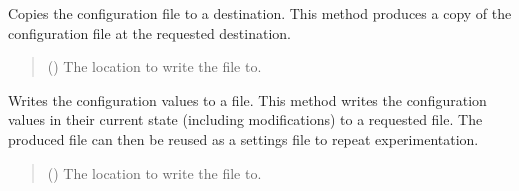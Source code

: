 \documentclass[letterpaper,10pt,english]{sphinxmanual}
\begin{document}
\begin{fulllineitems}
\begin{fulllineitems}
\begin{quote}
\begin{description}
\begin{itemize}
\end{itemize}

\end{description}\end{quote}

\end{fulllineitems}


\begin{fulllineitems}
\label{\detokenize{modules/input/config_handler:qnav.input.config_handler.ConfigHandler.copy_file}}
\pysigstartsignatures
{}
\pysigstopsignatures
\sphinxAtStartPar
Copies the configuration file to a destination.
This method produces a copy of the configuration file at the
requested destination.
\begin{quote}\begin{description}
\sphinxAtStartPar
{} () \textendash{} The location to write the file to.

\end{description}\end{quote}

\end{fulllineitems}


\begin{fulllineitems}
\label{\detokenize{modules/input/config_handler:qnav.input.config_handler.ConfigHandler.write_file}}
\pysigstartsignatures
{}
\pysigstopsignatures
\sphinxAtStartPar
Writes the configuration values to a file.
This method writes the configuration values in their current state
(including modifications) to a requested file. The produced file can
then be re\sphinxhyphen{}used as a settings file to repeat experimentation.
\begin{quote}\begin{description}
\sphinxAtStartPar
{} () \textendash{} The location to write the file to.

\end{description}\end{quote}

\end{fulllineitems}


\end{fulllineitems}
\end{document}
